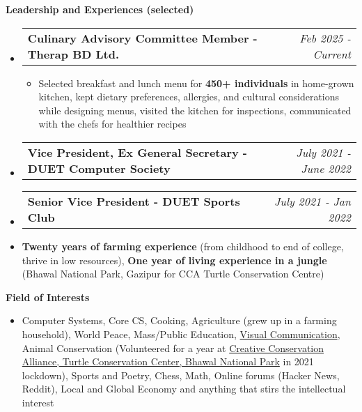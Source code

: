 \documentclass[legalpaper,10pt]{article}
\makeatletter
\newcommand{\resheading}[1]{{\large \colorbox{mygrey}{\begin{minipage}{\textwidth}{\textbf{#1 \vphantom{p\^{E}}}}\end{minipage}}}}
\newcommand{\ressubheading}[4]{
	\begin{tabular*}{7.1in}{l@{\extracolsep{\fill}}r}
		\textbf{#1} & \textit{#4} \\
	\end{tabular*}\vspace{-6pt}}
\makeatother
\begin{document}
	\vspace{0.15in}
	\resheading{Leadership and Experiences (selected)}
	\begin{itemize}

    	\item \ressubheading{Culinary Advisory Committee Member - Therap BD Ltd.}{}{}{Feb 2025 - Current}
		\begin{itemize}
		    \item Selected breakfast and lunch menu for \textbf{450+ individuals }in home-grown kitchen, kept dietary preferences, allergies, and cultural considerations while designing menus, visited the kitchen for inspections, communicated with the chefs for healthier recipes
		\end{itemize}
        
		\item \ressubheading{Vice President, Ex General Secretary - DUET Computer Society}{}{}{July 2021 - June 2022}
		
		\item \ressubheading{Senior Vice President - DUET Sports Club}{}{}{July 2021 - Jan 2022}

    	\item \textbf{Twenty years of farming experience} (from childhood to end of college, thrive in low resources), \textbf {One year of living experience in a jungle} (Bhawal National Park, Gazipur for CCA Turtle Conservation Centre)
		
	\end{itemize}

	\vspace{0.15in}
	\resheading{Field of Interests}
		\begin{itemize}
			\item Computer Systems, Core CS, Cooking, Agriculture (grew up in a farming household), World Peace, Mass/Public Education, \href{https://www.instagram.com/obepari/}{Visual Communication}, Animal Conservation (Volunteered for a year at \url{} \href{https://www.instagram.com/creativeconservationalliance/}{Creative Conservation Alliance, Turtle Conservation Center, Bhawal National Park} in 2021 lockdown), Sports and Poetry, Chess, Math, Online forums (Hacker News, Reddit), Local and Global Economy and anything that stirs the intellectual interest
		\end{itemize}
\end{document}
